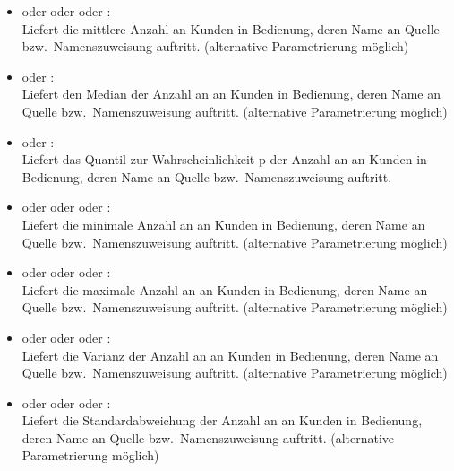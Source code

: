 \begin{itemize}    
 
\item
{} oder  oder  oder :\\
Liefert die mittlere Anzahl an Kunden in Bedienung, deren Name an Quelle bzw.\ Namenszuweisung  auftritt.
(alternative Parametrierung möglich)

\item
{} oder :\\
Liefert den Median der Anzahl an an Kunden in Bedienung, deren Name an Quelle bzw.\ Namenszuweisung  auftritt.
(alternative Parametrierung möglich)

\item
{} oder :\\
Liefert das Quantil zur Wahrscheinlichkeit p der Anzahl an an Kunden in Bedienung, deren Name an Quelle bzw.\ Namenszuweisung  auftritt.

\item
{} oder  oder  oder :\\
Liefert die minimale Anzahl an an Kunden in Bedienung, deren Name an Quelle bzw.\ Namenszuweisung  auftritt.
(alternative Parametrierung möglich)

\item
{} oder  oder  oder :\\
Liefert die maximale Anzahl an an Kunden in Bedienung, deren Name an Quelle bzw.\ Namenszuweisung  auftritt.
(alternative Parametrierung möglich)

\item
{} oder  oder  oder :\\
Liefert die Varianz der Anzahl an an Kunden in Bedienung, deren Name an Quelle bzw.\ Namenszuweisung  auftritt.
(alternative Parametrierung möglich)

\item
{} oder  oder  oder :\\
Liefert die Standardabweichung der Anzahl an an Kunden in Bedienung, deren Name an Quelle bzw.\ Namenszuweisung  auftritt.
(alternative Parametrierung möglich)


\end{itemize}
